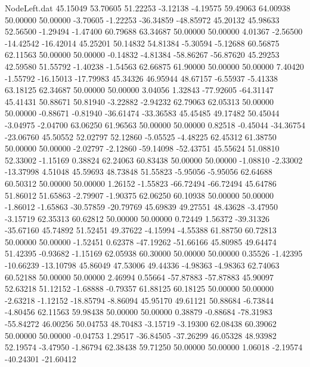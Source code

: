 \begin{filecontents}{NodeLeft.dat}
  45.15049   53.70605   51.22253    -3.12138   -4.19575   59.49063   64.00938   50.00000   50.00000   -3.70605   -1.22253  -36.34859  -48.85972
  45.20132   45.98633   52.56500    -1.29494   -1.47400   60.79688   63.34687   50.00000   50.00000    4.01367   -2.56500  -14.42542  -16.42014
  45.25201   50.14832   54.81384    -5.30594   -5.12688   60.56875   62.11563   50.00000   50.00000   -0.14832   -4.81384  -58.86267  -56.87620
  45.29253   42.59580   51.55792    -1.40238   -1.54563   62.66875   61.90000   50.00000   50.00000    7.40420   -1.55792  -16.15013  -17.79983
  45.34326   46.95944   48.67157    -6.55937   -5.41338   63.18125   62.34687   50.00000   50.00000    3.04056    1.32843  -77.92605  -64.31147
  45.41431   50.88671   50.81940    -3.22882   -2.94232   62.79063   62.05313   50.00000   50.00000   -0.88671   -0.81940  -36.61474  -33.36583
  45.45485   49.17482   50.45044    -3.04975   -2.04700   63.06250   61.96563   50.00000   50.00000    0.82518   -0.45044  -34.36754  -23.06760
  45.50552   52.02797   52.12860    -5.05525   -4.48225   62.45312   61.38750   50.00000   50.00000   -2.02797   -2.12860  -59.14098  -52.43751
  45.55624   51.08810   52.33002    -1.15169    0.38824   62.24063   60.83438   50.00000   50.00000   -1.08810   -2.33002  -13.37998    4.51048
  45.59693   48.73848   51.55823    -5.95056   -5.95056   62.64688   60.50312   50.00000   50.00000    1.26152   -1.55823  -66.72494  -66.72494
  45.64786   51.86012   51.65863    -2.79907   -1.90375   62.06250   60.10938   50.00000   50.00000   -1.86012   -1.65863  -30.57859  -20.79769
  45.69839   49.27551   48.43628    -3.47950   -3.15719   62.35313   60.62812   50.00000   50.00000    0.72449    1.56372  -39.31326  -35.67160
  45.74892   51.52451   49.37622    -4.15994   -4.55388   61.88750   60.72813   50.00000   50.00000   -1.52451    0.62378  -47.19262  -51.66166
  45.80985   49.64474   51.42395    -0.93682   -1.15169   62.05938   60.30000   50.00000   50.00000    0.35526   -1.42395  -10.66239  -13.10798
  45.86049   47.53006   49.44336    -4.98363   -4.98363   62.74063   60.52188   50.00000   50.00000    2.46994    0.55664  -57.87883  -57.87883
  45.90097   52.63218   51.12152    -1.68888   -0.79357   61.88125   60.18125   50.00000   50.00000   -2.63218   -1.12152  -18.85794   -8.86094
  45.95170   49.61121   50.88684    -6.73844   -4.80456   62.11563   59.98438   50.00000   50.00000    0.38879   -0.88684  -78.31983  -55.84272
  46.00256   50.04753   48.70483    -3.15719   -3.19300   62.08438   60.39062   50.00000   50.00000   -0.04753    1.29517  -36.84505  -37.26299
  46.05328   48.93982   52.19574    -3.47950   -1.86794   62.38438   59.71250   50.00000   50.00000    1.06018   -2.19574  -40.24301  -21.60412

\end{filecontents}
